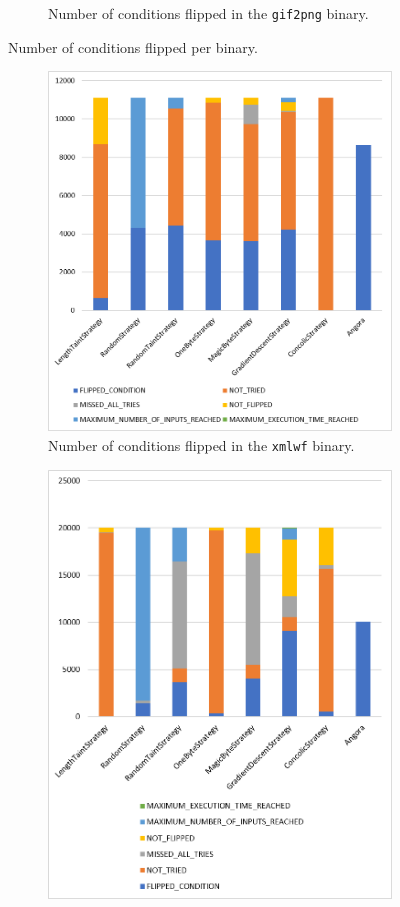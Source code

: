 \begin{figure}[H]
\begin{subfigure}[b]{0.49\textwidth}
        \caption{Number of conditions flipped in the  \texttt{gif2png} binary.}
        \label{fig:gif2pngStatus}
    \end{subfigure}
\caption{Number of conditions flipped per binary.}
\end{figure}

\begin{figure}[H]
    \centering
    \begin{subfigure}[b]{0.49\textwidth}
        \centering
        \includegraphics[width=.8\linewidth]{5_results/graphs/xmlwf-status.png}  
        \caption{Number of conditions flipped in the  \texttt{xmlwf} binary.}
        \label{fig:xmlwfStatus}
    \end{subfigure}
    \hfill
    \begin{subfigure}[b]{0.49\textwidth}
        \centering
        \includegraphics[width=.8\linewidth]{5_results/graphs/nm-status.png}  

\end{subfigure}
\end{figure}
